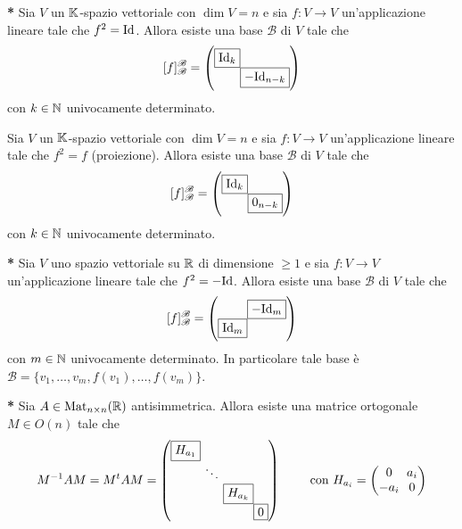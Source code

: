 
\begin{thm} \textbf{*}
	Sia $ V $ un $ \mathbb{K} $-spazio vettoriale con $ \dim{V} = n $ e sia $ f \colon V \to V $ un'applicazione lineare tale che $ f^{2} = \mathrm{Id} $. Allora esiste una base $ \mathscr{B} $ di $ V $ tale che 
	\[[f]_{\mathscr{B}}^{\mathscr{B}} = 
	\setlength{\arraycolsep}{0pt}
	\begin{pmatrix}
	\fbox{$ \Id_k $} & \\
	& \fbox{$ -\Id_{n - k} $}
	\end{pmatrix}\]
	con $ k \in \mathbb{N} $ univocamente determinato.
\end{thm}

\begin{thm}
	Sia $ V $ un $ \mathbb{K} $-spazio vettoriale con $ \dim{V} = n $ e sia $ f \colon V \to V $ un'applicazione lineare tale che $ f^{2} = f $ (proiezione). Allora esiste una base $ \mathscr{B} $ di $ V $ tale che 
	\[[f]_{\mathscr{B}}^{\mathscr{B}} = 
	\setlength{\arraycolsep}{0pt}
	\begin{pmatrix}
	\fbox{$ \Id_k $} & \\
	& \fbox{$ 0_{n - k} $}
	\end{pmatrix}\]
	con $ k \in \mathbb{N} $ univocamente determinato.
\end{thm}

\begin{thm} \textbf{*}
	Sia $ V $ uno spazio vettoriale su $ \mathbb{R} $ di dimensione $ \geq 1 $ e sia $ f \colon V \to V $ un'applicazione lineare tale che $ f^{2} = - \mathrm{Id} $. Allora esiste una base $ \mathscr{B} $ di $ V $ tale che 
	\[[f]_{\mathscr{B}}^{\mathscr{B}} = 
	\setlength{\arraycolsep}{0pt}
	\begin{pmatrix}
	& \fbox{$ -\Id_m $}\\
	\fbox{$ \Id_m $} & 
	\end{pmatrix}\]
	con $ m \in \mathbb{N} $ univocamente determinato. In particolare tale base è $ \mathscr{B} = \{v_1, \ldots, v_m, f(v_1), \ldots, f(v_m)\} $.
\end{thm}

\begin{thm} \textbf{*}
	Sia $ A \in \mathrm{Mat}_{n \times n}(\mathbb{R}) $ antisimmetrica. Allora esiste una matrice ortogonale $ M \in O(n) $ tale che 
	\[M^{-1} A M = M^{t} A M = 
	\setlength{\arraycolsep}{0pt}
	\begin{pmatrix}
	\fbox{$ H_{a_1} $} & & &\\
	& \ \ddots \ & & \\
	& & \fbox{$ H_{a_k} $} & \\
	& & & \fbox{$ 0 $}
	\end{pmatrix}
	\qquad
	\text{ con }
	H_{a_i} = 
	\setlength{\arraycolsep}{3pt}
	\begin{pmatrix}
	0 & a_{i} \\
	-a_{i} & 0
	\end{pmatrix}\]
\end{thm}